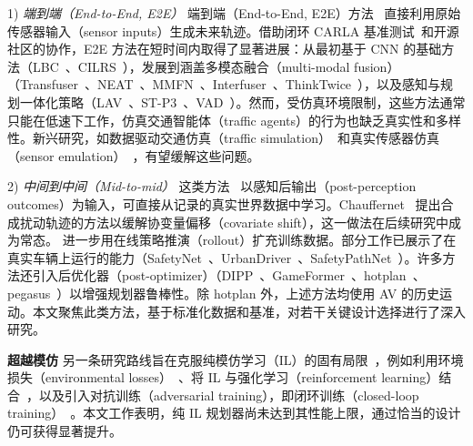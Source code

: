 \documentclass[letterpaper, 10 pt, conference]{ieeeconf}  %
\renewcommand{\paragraph}[1]{\vspace{1.25mm}\noindent\textbf{#1}}
\begin{document}
1) \textit{端到端（End-to-End, E2E）}
端到端（End-to-End, E2E）方法~\cite{zeng2019nmp,hu2022st-p3,hu2023uniAD,jiang2023vad,codevilla2019cilrs,chen2020lbc,chen2022lav,chitta2021neat,chitta2022transfuser,zhang2022mmfn, shao2023interfuser, jia2023think} 直接利用原始传感器输入（sensor inputs）生成未来轨迹。借助闭环 CARLA 基准测试~\cite{dosovitskiy2017carla}和开源社区的协作，E2E 方法在短时间内取得了显著进展：从最初基于 CNN 的基础方法（LBC~\cite{chen2020lbc}、CILRS~\cite{codevilla2019cilrs}），发展到涵盖多模态融合（multi-modal fusion）（Transfuser~\cite{chitta2022transfuser}、NEAT~\cite{chitta2021neat}、MMFN~\cite{zhang2022mmfn}、Interfuser~\cite{chitta2022transfuser}、ThinkTwice~\cite{jia2023think}），以及感知与规划一体化策略（LAV~\cite{chen2022lav}、ST-P3~\cite{hu2022st-p3}、VAD~\cite{jiang2023vad}）。然而，受仿真环境限制，这些方法通常只能在低速下工作，仿真交通智能体（traffic agents）的行为也缺乏真实性和多样性。新兴研究，如数据驱动交通仿真（traffic simulation）~\cite{igl2022symphony,li2023scenarionet}和真实传感器仿真（sensor emulation）~\cite{amini2022vista,wu2023mars}，有望缓解这些问题。

2) \textit{中间到中间（Mid-to-mid）}
这类方法~\cite{cheng2022mpnp,scheel2022urban,huang2023gameformer,hu2023hotplan,vitelli2022safetynet,pini2023safepathnet,bansal2018chauffeurnet,huang2023dipp,guo2023ccil,renz2023plant} 以感知后输出（post-perception outcomes）为输入，可直接从记录的真实世界数据中学习。Chauffernet~\cite{bansal2018chauffeurnet} 提出合成扰动轨迹的方法以缓解协变量偏移（covariate shift），这一做法在后续研究中成为常态。\cite{zhou2021exploring} 进一步用在线策略推演（rollout）扩充训练数据。部分工作已展示了在真实车辆上运行的能力（SafetyNet~\cite{vitelli2022safetynet}、UrbanDriver~\cite{scheel2022urban}、SafetyPathNet~\cite{pini2023safepathnet}）。许多方法还引入后优化器（post-optimizer）（DIPP~\cite{huang2023dipp}、GameFormer~\cite{huang2023gameformer}、hotplan~\cite{hu2023hotplan}、pegasus~\cite{xiimitation}）以增强规划器鲁棒性。除 hotplan 外，上述方法均使用 AV 的历史运动。本文聚焦此类方法，基于标准化数据和基准，对若干关键设计选择进行了深入研究。

\paragraph{超越模仿}
另一条研究路线旨在克服纯模仿学习（IL）的固有局限~\cite{muller2005offroad, wang2019monocular, wen2020fighting}，例如利用环境损失（environmental losses）~\cite{bansal2018chauffeurnet, zhou2021exploring}、将 IL 与强化学习（reinforcement learning）结合~\cite{lu2022imitation_not_enough, liu2022improved, huang2022efficient}，以及引入对抗训练（adversarial training），即闭环训练（closed-loop training）~\cite{baram2017end, bronstein2022hierarchical, couto2023hierarchical}。本文工作表明，纯 IL 规划器尚未达到其性能上限，通过恰当的设计仍可获得显著提升。
\end{document}
